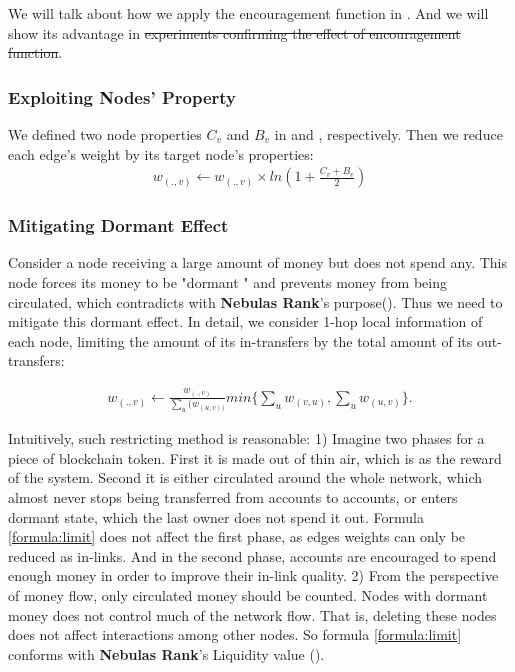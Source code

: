 We will talk about how we apply the encouragement function in . And we will show its advantage in  \st{experiments confirming the effect of encouragement function}.

\subsubsection{Exploiting Nodes' Property} \label{subsec:reduction}
We defined two node properties $C_v$ and $B_v$ in  and , respectively. Then we reduce each edge's weight by its target node's properties:
\begin{align}
	w_{(.,v)} \leftarrow w_{(.,v)} \times ln(1 + \frac{C_v + B_v}{2})
\end{align}

\subsubsection{Mitigating Dormant Effect} \label{subsec:limit}
Consider a node receiving a large amount of money but does not spend any. This node forces its money to be "dormant " and prevents money from being circulated, which contradicts with \textbf{Nebulas Rank}'s purpose(). Thus we need to mitigate this dormant effect. In detail, we consider 1-hop local information of each node, limiting the amount of its in-transfers by the total amount of its out-transfers:

\begin{align}
\label{formula:limit}
w_{(.,v)} \leftarrow  \frac{w_{(.,v)}}{\sum_u(w_{(u,v))}} min\{ \sum_u{w_{(v,u)}}, \sum_u{w_{(u,v)}} \}.
\end{align}

Intuitively, such restricting method is reasonable: 1) Imagine two phases for a piece of blockchain token. First it is made out of thin air, which is as the reward of the system. Second it is either circulated around the whole network, which almost never stops being transferred from accounts to accounts, or enters dormant state, which the last owner does not spend it out. Formula \ref{formula:limit} does not affect the first phase, as edges weights can only be reduced as in-links. And in the second phase, accounts are encouraged to spend enough money in order to improve their in-link quality. 2) From the perspective of money flow, only circulated money should be counted. Nodes with dormant money does not control much of the network flow. That is, deleting these nodes does not affect interactions among other nodes. So formula \ref{formula:limit} conforms with \textbf{Nebulas Rank}'s Liquidity value ().


